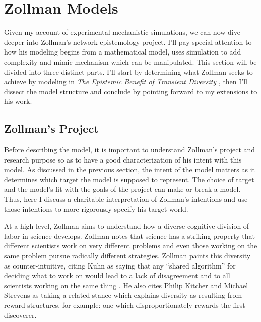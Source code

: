 \hypertarget{zollman-models}{%
\chapter{Zollman Models}\label{zollman-models}}

Given my account of experimental mechanistic simulations, we can now
dive deeper into Zollman's network epistemology project. I'll pay
special attention to how his modeling begins from a mathematical model,
uses simulation to add complexity and mimic mechanism which can be
manipulated. This section will be divided into three distinct parts.
I'll start by determining what Zollman seeks to achieve by modeling in
\emph{The Epistemic Benefit of Transient Diversity}
\autocite{zollmanEpistemicBenefitTransient2009}, then I'll dissect the
model structure and conclude by pointing forward to my extensions to his
work.

\hypertarget{zollmans-project}{%
\section{Zollman's Project}\label{zollmans-project}}

Before describing the model, it is important to understand Zollman's
project and research purpose so as to have a good characterization of
his intent with this model. As discussed in the previous section, the
intent of the model matters as it determines which target the model is
supposed to represent. The choice of target and the model's fit with the
goals of the project can make or break a model. Thus, here I discuss a
charitable interpretation of Zollman's intentions and use those
intentions to more rigorously specify his target world.

At a high level, Zollman aims to understand how a diverse cognitive
division of labor in science develops. Zollman notes that science has a
striking property that different scientists work on very different
problems and even those working on the same problem pursue radically
different strategies. Zollman paints this diversity as
counter-intuitive, citing Kuhn as saying that any ``shared algorithm''
for deciding what to work on would lead to a lack of disagreement and to
all scientists working on the same thing
\autocite[p.~332][]{kuhnCollectiveBeliefScientific1977}. He also cites
Philip Kitcher \autocite{kitcherDivisionCognitiveLabor1990a} and Michael
Strevens \autocite{strevensRolePriorityRule2003a} as taking a related
stance which explains diversity as resulting from reward structures, for
example: one which disproportionately rewards the first discoverer.

